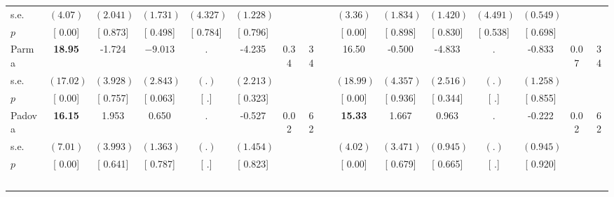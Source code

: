 \begin{longtable}{L{8em} c c c c c c c p{1em} c c c c c c c}
\quad \quad \quad \quad s.e.& $ (     4.07)$ & $ (    2.041)$ & $ (    1.731)$ & $ (    4.327)$ & $ (    1.228)$ & & & & $ (     3.36)$ & $ (    1.834)$ & $ (    1.420)$ & $ (    4.491)$ & $ (    0.549)$ & &  \\*
\quad \quad \quad \quad $ p$ & [     0.00] & [    0.873] & [    0.498] & [    0.784] & [    0.796] & & & & [     0.00] & [    0.898] & [    0.830] & [    0.538] & [    0.698] & &  \\[1em]
\quad \quad \quad Parma& \textbf{    18.95} &    -1.724 & $ \mathbf{   -9.013}$ &         . &    -4.235 &      0.34 &        34 & & 16.50 &    -0.500 &    -4.833 &         . &    -0.833 &      0.07 &        34  \\*
\quad \quad \quad \quad s.e.& $ (    17.02)$ & $ (    3.928)$ & $ (    2.843)$ & $ (        .)$ & $ (    2.213)$ & & & & $ (    18.99)$ & $ (    4.357)$ & $ (    2.516)$ & $ (        .)$ & $ (    1.258)$ & &  \\*
\quad \quad \quad \quad $ p$ & [     0.00] & [    0.757] & [    0.063] & [        .] & [    0.323] & & & & [     0.00] & [    0.936] & [    0.344] & [        .] & [    0.855] & &  \\[1em]
\quad \quad \quad Padova& \textbf{    16.15} &     1.953 &     0.650 &         . &    -0.527 &      0.02 &        62 & & \textbf{    15.33} &     1.667 &     0.963 &         . &    -0.222 &      0.02 &        62  \\*
\quad \quad \quad \quad s.e.& $ (     7.01)$ & $ (    3.993)$ & $ (    1.363)$ & $ (        .)$ & $ (    1.454)$ & & & & $ (     4.02)$ & $ (    3.471)$ & $ (    0.945)$ & $ (        .)$ & $ (    0.945)$ & &  \\*
\quad \quad \quad \quad $ p$ & [     0.00] & [    0.641] & [    0.787] & [        .] & [    0.823] & & & & [     0.00] & [    0.679] & [    0.665] & [        .] & [    0.920] & &  \\[1em]
~\\[1em]
\end{longtable}